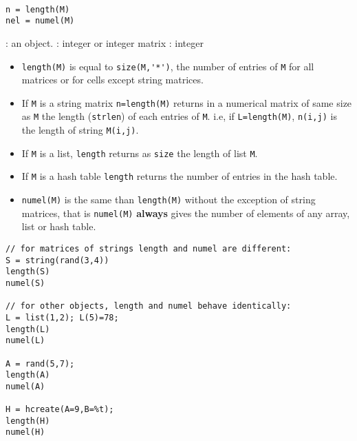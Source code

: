
\begin{mandesc}
   \\
\end{mandesc}
\begin{calling_sequence}
\begin{verbatim}
n = length(M)   
nel = numel(M)   
\end{verbatim}
\end{calling_sequence}

\begin{parameters}
  \begin{varlist}
    : an object.
    : integer or integer matrix
    : integer
  \end{varlist}
\end{parameters}

\begin{mandescription}
\begin{itemize}
  \item \verb!length(M)! is equal to \verb!size(M,'*')!, the number of entries of \verb!M! for all matrices 
    or for cells except string matrices.
  \item If \verb+M+ is a string matrix \verb+n=length(M)+ returns in a  numerical matrix of same size 
    as \verb+M+ the length (\verb+strlen+) of each entries of \verb+M+. i.e, if \verb+L=length(M)+, 
    \verb+n(i,j)+ is the length of string \verb+M(i,j)+.
  \item If \verb+M+ is a list, \verb+length+ returns as \verb+size+ the length of list \verb+M+.
  \item If \verb+M+ is a hash table \verb+length+ returns the number of entries in the hash table.
  \item \verb!numel(M)! is the same than \verb!length(M)! without the exception of string matrices, that
        is \verb!numel(M)! {\bf always} gives the number of elements of any array, list or hash table.
\end{itemize}
\end{mandescription}

\begin{examples}
\begin{Verbatim}
// for matrices of strings length and numel are different: 
S = string(rand(3,4))
length(S)
numel(S)

// for other objects, length and numel behave identically:
L = list(1,2); L(5)=78; 
length(L)
numel(L)

A = rand(5,7);
length(A)
numel(A)
    
H = hcreate(A=9,B=%t);
length(H)
numel(H)
\end{Verbatim}
\end{examples}

\begin{manseealso}
\end{manseealso}

